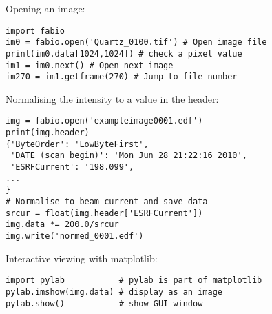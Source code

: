 \documentclass[preprint ]{iucr}
\begin{document}
Opening an image:

\begin{verbatim}
import fabio     
im0 = fabio.open('Quartz_0100.tif') # Open image file
print(im0.data[1024,1024]) # check a pixel value
im1 = im0.next() # Open next image
im270 = im1.getframe(270) # Jump to file number
\end{verbatim}

Normalising the intensity to a value in the header:

\begin{verbatim}
img = fabio.open('exampleimage0001.edf')
print(img.header)
{'ByteOrder': 'LowByteFirst',
 'DATE (scan begin)': 'Mon Jun 28 21:22:16 2010',
 'ESRFCurrent': '198.099',
...
}
# Normalise to beam current and save data
srcur = float(img.header['ESRFCurrent'])
img.data *= 200.0/srcur
img.write('normed_0001.edf')
\end{verbatim}

Interactive viewing with matplotlib:

\begin{verbatim}
import pylab           # pylab is part of matplotlib
pylab.imshow(img.data) # display as an image
pylab.show()           # show GUI window
\end{verbatim}



\end{document}
